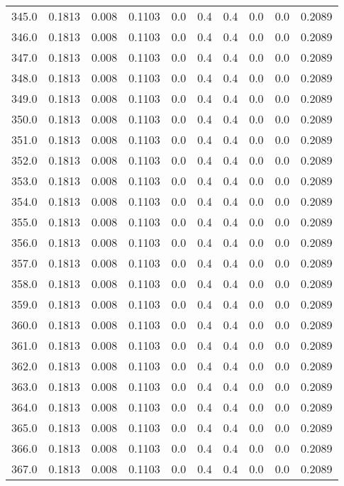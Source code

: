 \begin{longtable}{lrrrrrrrrr}
345.0 & 0.1813 & 0.008 & 0.1103 & 0.0 & 0.4 & 0.4 & 0.0 & 0.0 & 0.2089 \\
346.0 & 0.1813 & 0.008 & 0.1103 & 0.0 & 0.4 & 0.4 & 0.0 & 0.0 & 0.2089 \\
347.0 & 0.1813 & 0.008 & 0.1103 & 0.0 & 0.4 & 0.4 & 0.0 & 0.0 & 0.2089 \\
348.0 & 0.1813 & 0.008 & 0.1103 & 0.0 & 0.4 & 0.4 & 0.0 & 0.0 & 0.2089 \\
349.0 & 0.1813 & 0.008 & 0.1103 & 0.0 & 0.4 & 0.4 & 0.0 & 0.0 & 0.2089 \\
350.0 & 0.1813 & 0.008 & 0.1103 & 0.0 & 0.4 & 0.4 & 0.0 & 0.0 & 0.2089 \\
351.0 & 0.1813 & 0.008 & 0.1103 & 0.0 & 0.4 & 0.4 & 0.0 & 0.0 & 0.2089 \\
352.0 & 0.1813 & 0.008 & 0.1103 & 0.0 & 0.4 & 0.4 & 0.0 & 0.0 & 0.2089 \\
353.0 & 0.1813 & 0.008 & 0.1103 & 0.0 & 0.4 & 0.4 & 0.0 & 0.0 & 0.2089 \\
354.0 & 0.1813 & 0.008 & 0.1103 & 0.0 & 0.4 & 0.4 & 0.0 & 0.0 & 0.2089 \\
355.0 & 0.1813 & 0.008 & 0.1103 & 0.0 & 0.4 & 0.4 & 0.0 & 0.0 & 0.2089 \\
356.0 & 0.1813 & 0.008 & 0.1103 & 0.0 & 0.4 & 0.4 & 0.0 & 0.0 & 0.2089 \\
357.0 & 0.1813 & 0.008 & 0.1103 & 0.0 & 0.4 & 0.4 & 0.0 & 0.0 & 0.2089 \\
358.0 & 0.1813 & 0.008 & 0.1103 & 0.0 & 0.4 & 0.4 & 0.0 & 0.0 & 0.2089 \\
359.0 & 0.1813 & 0.008 & 0.1103 & 0.0 & 0.4 & 0.4 & 0.0 & 0.0 & 0.2089 \\
360.0 & 0.1813 & 0.008 & 0.1103 & 0.0 & 0.4 & 0.4 & 0.0 & 0.0 & 0.2089 \\
361.0 & 0.1813 & 0.008 & 0.1103 & 0.0 & 0.4 & 0.4 & 0.0 & 0.0 & 0.2089 \\
362.0 & 0.1813 & 0.008 & 0.1103 & 0.0 & 0.4 & 0.4 & 0.0 & 0.0 & 0.2089 \\
363.0 & 0.1813 & 0.008 & 0.1103 & 0.0 & 0.4 & 0.4 & 0.0 & 0.0 & 0.2089 \\
364.0 & 0.1813 & 0.008 & 0.1103 & 0.0 & 0.4 & 0.4 & 0.0 & 0.0 & 0.2089 \\
365.0 & 0.1813 & 0.008 & 0.1103 & 0.0 & 0.4 & 0.4 & 0.0 & 0.0 & 0.2089 \\
366.0 & 0.1813 & 0.008 & 0.1103 & 0.0 & 0.4 & 0.4 & 0.0 & 0.0 & 0.2089 \\
367.0 & 0.1813 & 0.008 & 0.1103 & 0.0 & 0.4 & 0.4 & 0.0 & 0.0 & 0.2089 \\

\end{longtable}
